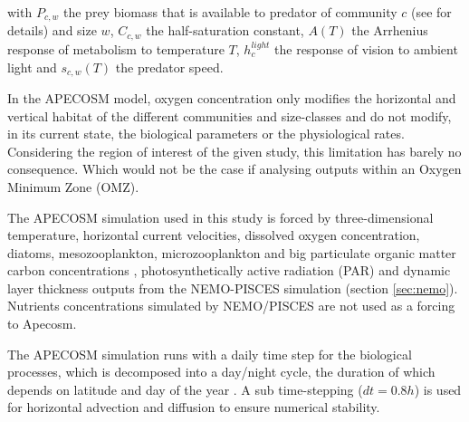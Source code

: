 with $P_{c,w}$ the prey biomass that is available to predator of community $c$ (see \citealt{mauryIndividualsPopulationsCommunities2013} for details) and size $w$, $C_{c,w}$ the half-saturation constant, $A(T)$ the
Arrhenius response of metabolism to temperature $T$, $h_c^{light}$
the response of vision to
ambient light and $s_{c,w}(T)$ the predator speed.

In the APECOSM model, oxygen concentration only modifies the horizontal and vertical habitat of the different communities and size-classes and do not modify, in its current state, the  biological parameters or the physiological rates. Considering the region of interest of the given study, this limitation has barely no consequence. Which would not be the case if analysing outputs within an Oxygen Minimum Zone (OMZ). 



The APECOSM simulation used in this study is forced by three-dimensional temperature, horizontal current velocities, dissolved oxygen concentration, diatoms, mesozooplankton, microzooplankton and big particulate organic matter carbon concentrations \citep{aumontPISCESv2OceanBiogeochemical2015}, photosynthetically active radiation (PAR) and dynamic layer thickness outputs from the NEMO-PISCES simulation (section \ref{sec:nemo}). Nutrients concentrations simulated by NEMO/PISCES are not used as a forcing to Apecosm.

The APECOSM simulation runs with a daily time step for the biological processes, which is decomposed into a day/night cycle, the duration of which  depends on latitude and day of the year \citep{forsytheModelComparisonDaylength1995}. A sub time-stepping ($dt =0.8h$) is used for horizontal advection and diffusion to ensure numerical stability.

